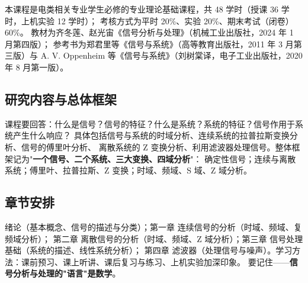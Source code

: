 本课程是电类相关专业学生必修的专业理论基础课程，共 48 学时（授课 36 学时，上机实验 12 学时）；
考核方式为平时 20\%、实验 20\%、期末考试（闭卷）60\%。
教材为齐冬莲、赵光宙《信号分析与处理》（机械工业出版社，2024 年 1 月第四版）；
参考书为郑君里等《信号与系统》（高等教育出版社，2011 年 3 月第三版）与
A. V. Oppenheim 等《信号与系统》（刘树棠译，电子工业出版社，2020 年 8 月第一版）。

\subsection{研究内容与总体框架}

课程要回答：什么是信号？信号的特征？什么是系统？系统的特征？信号作用于系统产生什么响应？
具体包括信号与系统的时域分析、连续系统的拉普拉斯变换分析、信号的傅里叶分析、
离散系统的 Z 变换分析、利用滤波器处理信号。整体框架记为"\textbf{一个信号、二个系统、三大变换、四域分析}"：
确定性信号；连续与离散系统；傅里叶、拉普拉斯、Z 变换；时域、频域、S 域、Z 域分析。

\subsection{章节安排}

绪论（基本概念、信号的描述与分类）；第一章 连续信号的分析（时域、频域、复频域分析）；
第二章 离散信号的分析（时域、频域、Z 域分析）；第三章 信号处理基础（系统的描述、线性系统分析）；
第四章 滤波器（处理信号与噪声）。学习方法：课前预习、课上听讲、课后复习与练习、上机实验加深印象。
要记住——\textbf{信号分析与处理的"语言"是数学}。
